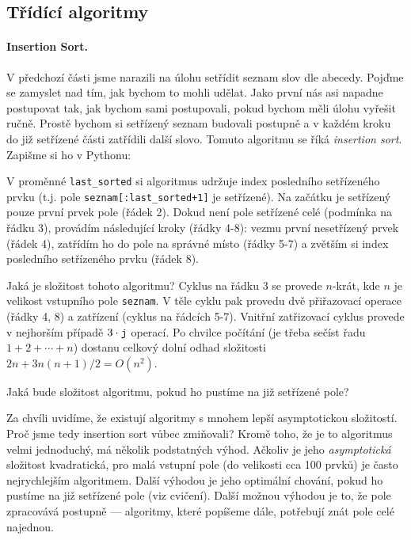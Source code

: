 \subsection*{Třídící algoritmy} 
\paragraph{Insertion Sort.} 
V předchozí části jsme narazili na úlohu setřídit seznam slov dle abecedy. Pojďme se zamyslet nad tím, jak bychom to mohli udělat. Jako první nás asi napadne postupovat
tak, jak bychom sami postupovali, pokud bychom měli úlohu vyřešit ručně. Prostě bychom si setřízený seznam budovali postupně a v každém kroku do již setřízené části
zatřídili další slovo. Tomuto algoritmu se říká \emph{insertion sort}. Zapišme si ho v Pythonu:


V proměnné {\tt last\_sorted} si algoritmus udržuje index posledního setřízeného prvku (t.j. pole {\tt seznam[:last\_sorted+1]} je setřízené).
Na začátku je setřízený pouze první prvek pole (řádek 2). Dokud není pole setřízené celé (podmínka na řádku 3), provádím následující kroky (řádky 4-8):
vezmu první nesetřízený prvek (řádek 4), zatřídím ho do pole na správné místo (řádky 5-7) a zvětším si index posledního setřízeného prvku (řádek 8).

Jaká je složitost tohoto algoritmu? Cyklus na řádku 3 se provede $n$-krát, kde $n$ je velikost vstupního pole {\tt seznam}. V těle cyklu pak provedu
dvě přiřazovací operace (řádky 4, 8) a zatřízení (cyklus na řádcích 5-7). Vnitřní zatřizovací cyklus provede v nejhorším případě $3\cdot {\tt j}$ operací.
Po chvilce počítání (je třeba sečíst řadu $1 + 2 + \cdots + n$) dostanu celkový dolní odhad složitosti $2n + 3n(n+1)/2 = O(n^2)$.

\begin{cviceni} Jaká bude složitost algoritmu, pokud ho pustíme na již setřízené pole?
\end{cviceni}

Za chvíli uvidíme, že existují algoritmy s mnohem lepší asymptotickou složitostí. Proč jsme tedy insertion sort vůbec zmiňovali? Kromě toho, že
je to algoritmus velmi jednoduchý, má několik podstatných výhod. Ačkoliv je jeho \emph{asymptotická} složitost kvadratická, pro malá vstupní pole
(do velikosti cca 100 prvků) je často nejrychlejším algoritmem. Další výhodou je jeho optimální chování, pokud ho pustíme na již setřízené pole
(viz cvičení). Další možnou výhodou je to, že pole zpracovává postupně --- algoritmy, které popíšeme dále, potřebují znát pole celé najednou.


